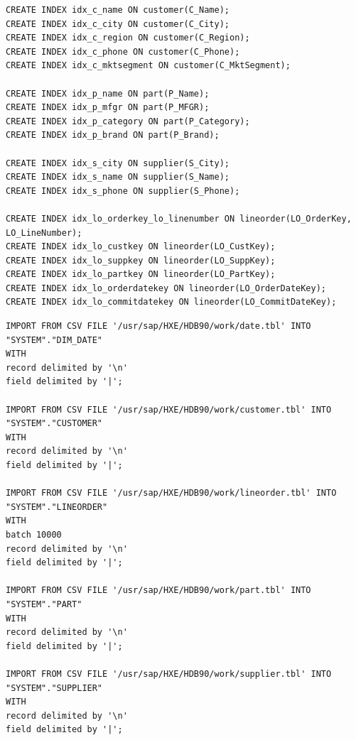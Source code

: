 \begin{lstlisting}[label=indizes, caption={Indizes hinzufügen}]
CREATE INDEX idx_c_name ON customer(C_Name);
CREATE INDEX idx_c_city ON customer(C_City);
CREATE INDEX idx_c_region ON customer(C_Region);
CREATE INDEX idx_c_phone ON customer(C_Phone);
CREATE INDEX idx_c_mktsegment ON customer(C_MktSegment);

CREATE INDEX idx_p_name ON part(P_Name);
CREATE INDEX idx_p_mfgr ON part(P_MFGR);
CREATE INDEX idx_p_category ON part(P_Category);
CREATE INDEX idx_p_brand ON part(P_Brand);

CREATE INDEX idx_s_city ON supplier(S_City);
CREATE INDEX idx_s_name ON supplier(S_Name);
CREATE INDEX idx_s_phone ON supplier(S_Phone);

CREATE INDEX idx_lo_orderkey_lo_linenumber ON lineorder(LO_OrderKey, LO_LineNumber);
CREATE INDEX idx_lo_custkey ON lineorder(LO_CustKey);
CREATE INDEX idx_lo_suppkey ON lineorder(LO_SuppKey);
CREATE INDEX idx_lo_partkey ON lineorder(LO_PartKey);
CREATE INDEX idx_lo_orderdatekey ON lineorder(LO_OrderDateKey);
CREATE INDEX idx_lo_commitdatekey ON lineorder(LO_CommitDateKey);
\end{lstlisting}




\begin{lstlisting}[label=importSQL, caption={import.sql}]
IMPORT FROM CSV FILE '/usr/sap/HXE/HDB90/work/date.tbl' INTO "SYSTEM"."DIM_DATE" 
WITH
record delimited by '\n' 
field delimited by '|';

IMPORT FROM CSV FILE '/usr/sap/HXE/HDB90/work/customer.tbl' INTO "SYSTEM"."CUSTOMER" 
WITH
record delimited by '\n' 
field delimited by '|';

IMPORT FROM CSV FILE '/usr/sap/HXE/HDB90/work/lineorder.tbl' INTO "SYSTEM"."LINEORDER" 
WITH
batch 10000
record delimited by '\n' 
field delimited by '|';

IMPORT FROM CSV FILE '/usr/sap/HXE/HDB90/work/part.tbl' INTO "SYSTEM"."PART" 
WITH
record delimited by '\n' 
field delimited by '|';

IMPORT FROM CSV FILE '/usr/sap/HXE/HDB90/work/supplier.tbl' INTO "SYSTEM"."SUPPLIER" 
WITH
record delimited by '\n' 
field delimited by '|';
\end{lstlisting}

